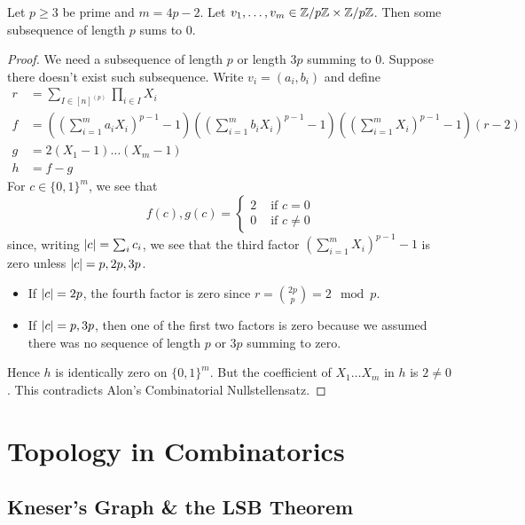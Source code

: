\documentclass{article}
\begin{document}
\begin{nthm}[R\'onyai]
  Let $p \ge 3$ be prime and $m = 4p - 2$. Let $v_1, \dots, v_m \in \mathbb Z/p\mathbb Z \times \mathbb Z/p\mathbb Z$. Then some subsequence of length $p$ sums to $0$.
\end{nthm}
\begin{proof}
  We need a subsequence of length $p$ or length $3p$ summing to $0$. Suppose there doesn't exist such subsequence. Write $v_i = (a_i, b_i)$ and define
  \begin{align*}
    r & = \sum_{I \in [n]^{(p)}} \prod_{i \in I} X_i \\
    f & = \left(\left(\sum_{i = 1}^m a_i X_i\right)^{p - 1} - 1\right)
    \left(\left(\sum_{i = 1}^m b_i X_i\right)^{p - 1} - 1\right)
    \left(\left(\sum_{i = 1}^m X_i\right)^{p - 1} - 1\right)
    (r - 2) \\
    g & = 2(X_1 - 1) \dots (X_m - 1) \\
    h & = f - g
  \end{align*}
  For $c \in \{0, 1\}^m$, we see that
  $$f(c), g(c) =
  \begin{cases}
    2 & \text{ if } c = 0 \\
    0 & \text{ if } c \ne 0
  \end{cases}$$
  since, writing $\left\lvert c\right\rvert = \sum_i c_i$, we see that the third factor $\left(\sum_{i = 1}^m X_i\right)^{p - 1} - 1$ is zero unless $\left\lvert c\right\rvert = p, 2p, 3p$.
  \begin{itemize}
    \item If $\left\lvert c\right\rvert = 2p$, the fourth factor is zero since $r = \binom{2p}p = 2 \mod p$.
    \item If $\left\lvert c\right\rvert = p, 3p$, then one of the first two factors is zero because we assumed there was no sequence of length $p$ or $3p$ summing to zero.
  \end{itemize}
  Hence $h$ is identically zero on $\{0, 1\}^m$. But the coefficient of $X_1 \dots X_m$ in $h$ is $2 \ne 0$. This contradicts Alon's Combinatorial Nullstellensatz.
\end{proof}

\clearpage

\section{Topology in Combinatorics}

\subsection{Kneser's Graph \& the LSB Theorem}
\end{document}
